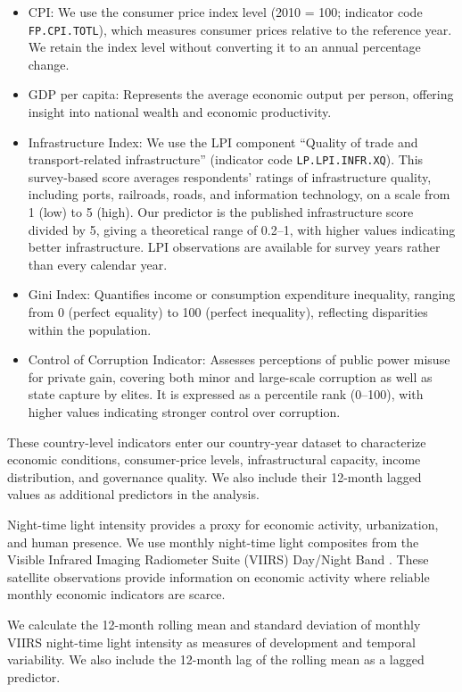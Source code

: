 \documentclass[pdflatex,sn-mathphys-num]{sn-jnl}%
\theoremstyle{thmstyleone}%
\theoremstyle{thmstyletwo}%
\theoremstyle{thmstylethree}%
\begin{document}
\begin{itemize}
\item CPI: We use the consumer price index level (2010 = 100; indicator code \texttt{FP.CPI.TOTL}), which measures consumer prices relative to the reference year. We retain the index level without converting it to an annual percentage change.
\item GDP per capita: Represents the average economic output per person, offering insight into national wealth and economic productivity.
\item Infrastructure Index: We use the LPI component ``Quality of trade and transport-related infrastructure'' (indicator code \texttt{LP.LPI.INFR.XQ}). This survey-based score averages respondents' ratings of infrastructure quality, including ports, railroads, roads, and information technology, on a scale from 1 (low) to 5 (high). Our predictor is the published infrastructure score divided by 5, giving a theoretical range of 0.2--1, with higher values indicating better infrastructure. LPI observations are available for survey years rather than every calendar year.
\item Gini Index: Quantifies income or consumption expenditure inequality, ranging from 0 (perfect equality) to 100 (perfect inequality), reflecting disparities within the population.
\item Control of Corruption Indicator: Assesses perceptions of public power misuse for private gain, covering both minor and large-scale corruption as well as state capture by elites. It is expressed as a percentile rank (0–100), with higher values indicating stronger control over corruption.
\end{itemize}

These country-level indicators enter our country-year dataset to characterize economic conditions, consumer-price levels, infrastructural capacity, income distribution, and governance quality. We also include their 12-month lagged values as additional predictors in the analysis.

Night-time light intensity provides a proxy for economic activity, urbanization, and human presence. We use monthly night-time light composites from the Visible Infrared Imaging Radiometer Suite (VIIRS) Day/Night Band \cite{EOG_VIIRS}. These satellite observations provide information on economic activity where reliable monthly economic indicators are scarce.

We calculate the 12-month rolling mean and standard deviation of monthly VIIRS night-time light intensity as measures of development and temporal variability. We also include the 12-month lag of the rolling mean as a lagged predictor.
\end{document}
